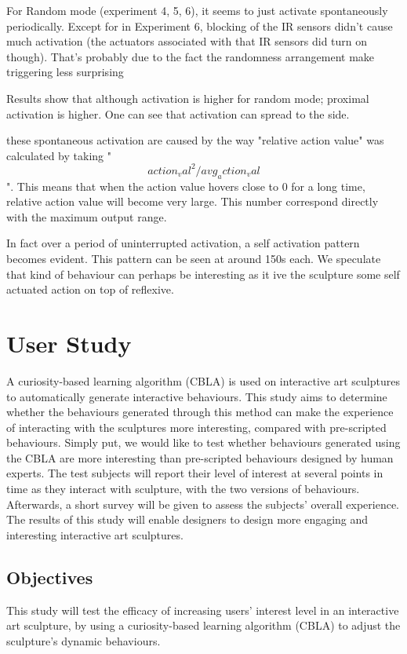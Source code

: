 For Random mode (experiment 4, 5, 6), it seems to just activate spontaneously periodically. Except for in Experiment 6, blocking of the IR sensors didn't cause much activation (the actuators associated with that IR sensors did turn on though). That's probably due to the fact the randomness arrangement make triggering less surprising 

Results show that although activation is higher for random mode; proximal activation is higher. One can see that activation can spread to the side. 

these spontaneous activation are caused by the way "relative action value" was calculated by taking "\[action_val^2/avg_action_val\]". This means that when the action value hovers close to 0 for a long time, relative action value will become very large. This number correspond directly with the maximum output range. 

In fact over a period of uninterrupted activation, a self activation pattern becomes evident. This pattern can be seen at around 150s each. We speculate that kind of behaviour can perhaps be interesting as it ive the sculpture some self actuated action on top of reflexive.  



\section{User Study}\label{sec:user-study}

A curiosity-based learning algorithm (CBLA) is used on interactive art sculptures to automatically generate interactive behaviours. This study aims to determine whether the behaviours generated through this method can make the experience of interacting with the sculptures more interesting, compared with pre-scripted behaviours. Simply put, we would like to test whether behaviours generated using the CBLA are more interesting than pre-scripted behaviours designed by human experts. The test subjects will report their level of interest at several points in time as they interact with sculpture, with the two versions of behaviours. Afterwards, a short survey will be given to assess the subjects' overall experience. The results of this study will enable designers to design more engaging and interesting interactive art sculptures. 

\subsection{Objectives}
This study will test the efficacy of increasing users' interest level in an interactive art sculpture, by using a curiosity-based learning algorithm (CBLA) to adjust the sculpture's dynamic behaviours. 

